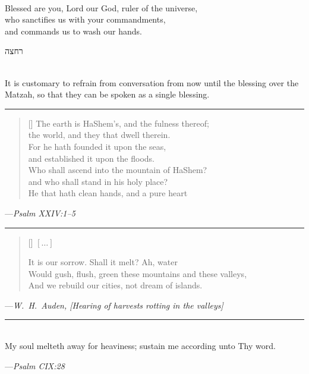 \documentclass[a4paper,12pt,openany]{memoir}
\newcommand{\HgEllipsis}{\ensuremath{\left[\ldots\right]}}
\newcommand{\HgSource}[1]{\hfill{\small---\itshape{#1}}}
\newcommand{\hchapter}[1]{
  \begin{hebrew}
    \begin{Spacing}{.97}
      \newpage
      \strut

      \vspace{.15em}

      \noindent\Huge #1

      \vspace{1em}
    \end{Spacing}
  \end{hebrew}
}
\newcommand{\HgFill}{\vfill \hrule \vfill}
\newenvironment{HgEnglish}{\strut\\\noindent}{\vspace{1em}}
\newcommand{\JSrc}{\textsuperscript{\upshape{[J]}}}
\newcommand{\SSrc}{\textsuperscript{\upshape{[S]}}}
\begin{document}
\begin{HgEnglish}
  Blessed are you, Lord our God, ruler of the universe, \\
  who sanctifies us with your commandments, \\
  and commands us to wash our hands.
\end{HgEnglish}

\vfill

\hchapter{רחצה}

\begin{HgEnglish}
It is customary to refrain from conversation from now until the blessing over
the Matzah, so that they can be spoken as a single blessing.
\end{HgEnglish}

\HgFill

\settowidth{\versewidth}{\vin Who shall ascend into the mountain of HaShem?}
\begin{verse}[\versewidth]
  The earth is HaShem's, and the fulness thereof; \\
  \vin the world, and they that dwell therein. \\
  For he hath founded it upon the seas, \\
  \vin and established it upon the floods. \\
  Who shall ascend into the mountain of HaShem? \\
  \vin and who shall stand in his holy place? \\
  He that hath clean hands, and a pure heart \\
\end{verse}
\HgSource{Psalm XXIV:1--5 \JSrc}

\HgFill

\settowidth{\versewidth}{Would gush, flush, green these mountains and these
valleys}
\begin{verse}[\versewidth]
  \HgEllipsis

  It is our sorrow. Shall it melt? Ah, water \\
  Would gush, flush, green these mountains and these valleys, \\
  And we rebuild our cities, not dream of islands.
\end{verse}

\HgSource{W.~H.~Auden, [Hearing of harvests rotting in the valleys]}

\HgFill

\begin{HgEnglish}
  My soul melteth away for heaviness; sustain me according unto Thy word.

  \HgSource{Psalm CIX:28 \SSrc}
\end{HgEnglish}
\end{document}
